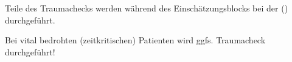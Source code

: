 {Teile des Traumachecks werden während des
Einschätzungsblocks
bei der 
() durchgeführt.  

Bei vital bedrohten (zeitkritischen) Patienten wird
ggfs.  Traumacheck 
durchgeführt! 
}{}{}{}





